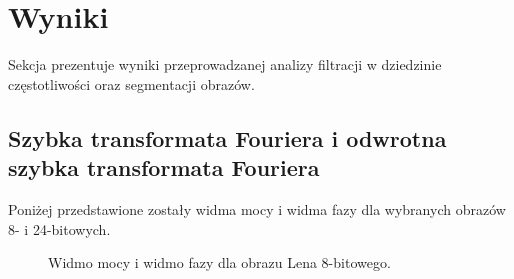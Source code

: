 \documentclass{classrep}
\begin{document}
\section{Wyniki}
Sekcja prezentuje wyniki przeprowadzanej analizy filtracji w dziedzinie częstotliwości oraz segmentacji obrazów.

\subsection{Szybka transformata Fouriera i odwrotna szybka transformata Fouriera}
Poniżej przedstawione zostały widma mocy i widma fazy dla wybranych obrazów 8- i 24-bitowych.

\begin{figure}[H]%
    \centering
    \qquad
    \qquad
    \qquad
    \qquad
    \qquad
    \qquad
    \caption{Widmo mocy i widmo fazy dla obrazu Lena 8-bitowego.}%
\end{figure} 
\end{document}

